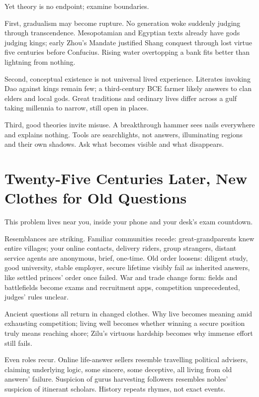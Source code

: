 Yet theory is no endpoint; examine boundaries.

First, gradualism may become rupture. No generation woke suddenly judging through transcendence. Mesopotamian and Egyptian texts already have gods judging kings; early Zhou's Mandate justified Shang conquest through lost virtue five centuries before Confucius. Rising water overtopping a bank fits better than lightning from nothing.

Second, conceptual existence is not universal lived experience. Literates invoking Dao against kings remain few; a third-century BCE farmer likely answers to clan elders and local gods. Great traditions and ordinary lives differ across a gulf taking millennia to narrow, still open in places.

Third, good theories invite misuse. A breakthrough hammer sees nails everywhere and explains nothing. Tools are searchlights, not answers, illuminating regions and their own shadows. Ask what becomes visible and what disappears.

\section[Old Questions in New Clothes]{Twenty-Five Centuries Later, New Clothes for Old Questions}
This problem lives near you, inside your phone and your desk's exam countdown.

Resemblances are striking. Familiar communities recede: great-grandparents knew entire villages; your online contacts, delivery riders, group strangers, distant service agents are anonymous, brief, one-time. Old order loosens: diligent study, good university, stable employer, secure lifetime visibly fail as inherited answers, like settled princes' order once failed. War and trade change form: fields and battlefields become exams and recruitment apps, competition unprecedented, judges' rules unclear.

Ancient questions all return in changed clothes. Why live becomes meaning amid exhausting competition; living well becomes whether winning a secure position truly means reaching shore; Zilu's virtuous hardship becomes why immense effort still fails.

Even roles recur. Online life-answer sellers resemble travelling political advisers, claiming underlying logic, some sincere, some deceptive, all living from old answers' failure. Suspicion of gurus harvesting followers resembles nobles' suspicion of itinerant scholars. History repeats rhymes, not exact events.

